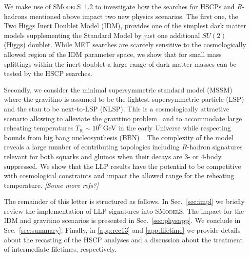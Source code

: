 \documentclass[preprint,number,sort&compress,twocolumn,3p]{elsstyarticle}
\newcommand{\smo}{\textsc{SModelS}}
\newcommand{\com}[1]{\emph{\color{red}[#1]}}  %
\begin{document}

We make use of \smo~1.2 to investigate how the searches for HSCPs and $R$-hadrons mentioned above impact two new physics scenarios. 
The first one, the Two Higgs Inert Doublet Model (IDM), provides one of the simplest dark matter models supplementing the Standard Model by just one additional $SU(2)$ (Higgs) doublet. 
While MET searches are scarcely sensitive to the cosmologically allowed region of the IDM parameter space, 
we show that for small mass splittings within the inert doublet a large range of dark matter masses
can be tested by the HSCP searches.

Secondly, we consider the minimal supersymmetric standard model (MSSM) 
where the gravitino is assumed to be the lightest supersymmetric particle (LSP) and the stau to be next-to-LSP (NLSP). This is a cosmologically attractive scenario allowing to alleviate the gravitino problem~\cite{Weinberg:1982zq,Ellis:1984eq,Falomkin:1984eu,Ellis:1984er} and to accommodate large reheating temperatures $T_\text{R}\sim10^9\,$GeV
in the early Universe while respecting bounds from big bang nucleosynthesis (BBN)~\cite{}.
The complexity of the model reveals a large number of contributing topologies including
$R$-hadron signatures relevant for both squarks and gluinos when their decays are 3- or 4-body suppressed.
We show that the LLP results have the potential to be competitive with cosmological constraints and impact the allowed range for the reheating temperature.
\com{Some more refs?}


The remainder of this letter is structured as follows. In Sec.~\ref{sec:impl} we briefly
review the implementation of LLP signatures into \smo. The impact for the 
IDM and gravitino scenarios is presented in Sec.~\ref{sec:physapp}. 
We conclude in Sec.~\ref{sec:summary}.
Finally, in \ref{app:rec13} and \ref{app:lifetime} we provide details about the recasting of the HSCP analyses 
and a discussion about the treatment of intermediate lifetimes, respectively.
\end{document}
